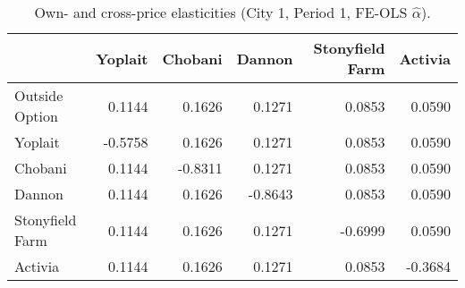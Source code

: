 \begin{table}[H]
\centering
\caption{Own- and cross-price elasticities (City 1, Period 1, FE-OLS $\hat\alpha$).}
\label{tab:q10_elast_c1t1_fe}
\begin{tabular}{lrrrrr}
\toprule
 & Yoplait & Chobani & Dannon & Stonyfield Farm & Activia \\
\midrule
Outside Option & 0.1144 & 0.1626 & 0.1271 & 0.0853 & 0.0590 \\
Yoplait & -0.5758 & 0.1626 & 0.1271 & 0.0853 & 0.0590 \\
Chobani & 0.1144 & -0.8311 & 0.1271 & 0.0853 & 0.0590 \\
Dannon & 0.1144 & 0.1626 & -0.8643 & 0.0853 & 0.0590 \\
Stonyfield Farm & 0.1144 & 0.1626 & 0.1271 & -0.6999 & 0.0590 \\
Activia & 0.1144 & 0.1626 & 0.1271 & 0.0853 & -0.3684 \\
\bottomrule
\end{tabular}
\end{table}
